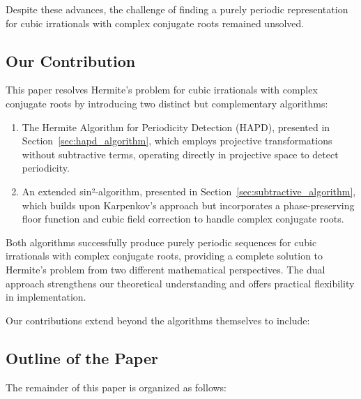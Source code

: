 Despite these advances, the challenge of finding a purely periodic representation for cubic irrationals with complex conjugate roots remained unsolved.

\subsection{Our Contribution}

This paper resolves Hermite's problem for cubic irrationals with complex conjugate roots by introducing two distinct but complementary algorithms:

\begin{enumerate}
\item The Hermite Algorithm for Periodicity Detection (HAPD), presented in Section~\ref{sec:hapd_algorithm}, which employs projective transformations without subtractive terms, operating directly in projective space to detect periodicity.

\item An extended sin²-algorithm, presented in Section~\ref{sec:subtractive_algorithm}, which builds upon Karpenkov's approach but incorporates a phase-preserving floor function and cubic field correction to handle complex conjugate roots.
\end{enumerate}

Both algorithms successfully produce purely periodic sequences for cubic irrationals with complex conjugate roots, providing a complete solution to Hermite's problem from two different mathematical perspectives. The dual approach strengthens our theoretical understanding and offers practical flexibility in implementation.

Our contributions extend beyond the algorithms themselves to include:

\subsection{Outline of the Paper}

The remainder of this paper is organized as follows:

